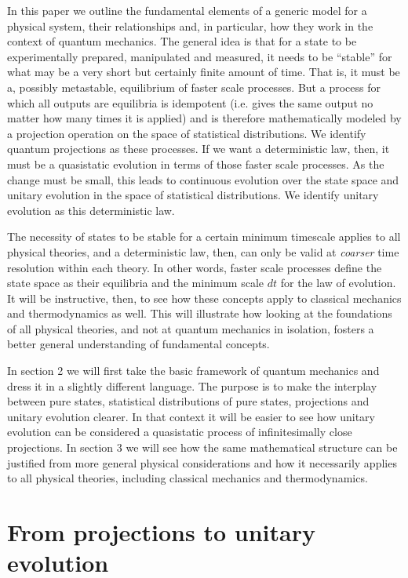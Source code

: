 \documentclass[11pt]{article}
\begin{document}
In this paper we outline the fundamental elements of a generic model for a physical system, their relationships and, in particular, how they work in the context of quantum mechanics. The general idea is that for a state to be experimentally prepared, manipulated and measured, it needs to be ``stable'' for what may be a very short but certainly finite amount of time. That is, it must be a, possibly metastable, equilibrium of faster scale processes. But a process for which all outputs are equilibria is idempotent (i.e. gives the same output no matter how many times it is applied) and is therefore mathematically modeled by a projection operation on the space of statistical distributions. We identify quantum projections as these processes. If we want a deterministic law, then, it must be a quasistatic evolution in terms of those faster scale processes. As the change must be small, this leads to continuous evolution over the state space and unitary evolution in the space of statistical distributions. We identify unitary evolution as this deterministic law.

The necessity of states to be stable for a certain minimum timescale applies to all physical theories, and a deterministic law, then, can only be valid at \emph{coarser} time resolution within each theory. In other words, faster scale processes define the state space as their equilibria and the minimum scale $dt$ for the law of evolution. It will be instructive, then, to see how these concepts apply to classical mechanics and thermodynamics as well. This will illustrate how looking at the foundations of all physical theories, and not at quantum mechanics in isolation, fosters a better general understanding of fundamental concepts.

In section 2 we will first take the basic framework of quantum mechanics and dress it in a slightly different language. The purpose is to make the interplay between pure states, statistical distributions of pure states, projections and unitary evolution clearer. In that context it will be easier to see how unitary evolution can be considered a quasistatic process of infinitesimally close projections. In section 3 we will see how the same mathematical structure can be justified from more general physical considerations and how it necessarily applies to all physical theories, including classical mechanics and thermodynamics. 

\section{From projections to unitary evolution}
\end{document}
